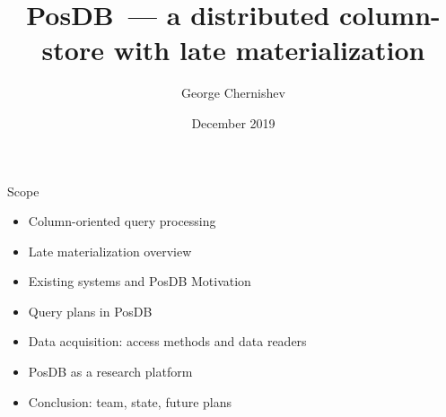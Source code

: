 \documentclass[compress, dvipsnames, unicode]{beamer}
\title[PosDB~--- a distributed column-store]{PosDB~--- a distributed column-store with late materialization
} %
\author{George Chernishev} %
\institute[] %
{
Saint-Petersburg State University,\\
National Research University Higher School of Economics\\

\medskip
\textit{chernishev@gmail.com} %
}
\date{December 2019}
\begin{document}
\begin{frame}
\titlepage %
\end{frame}

\begin{frame}{Scope}

\begin{itemize}
\setlength\itemsep{0.5em}
\item Column-oriented query processing
\item Late materialization overview
\item Existing systems and PosDB Motivation
\item Query plans in PosDB
\item Data acquisition: access methods and data readers
\item PosDB as a research platform
\item Conclusion: team, state, future plans
\end{itemize}
\end{frame}
\end{document}
